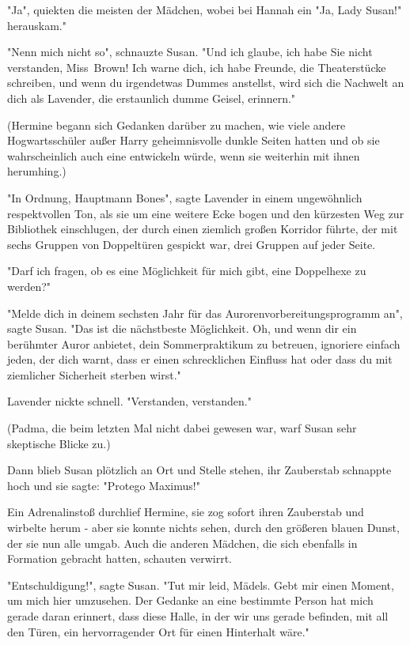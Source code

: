 {"Ja", quiekten die meisten der Mädchen, wobei bei Hannah ein "Ja, Lady Susan!" herauskam."

"Nenn mich nicht so", schnauzte Susan. "Und ich glaube, ich habe Sie nicht verstanden, Miss~Brown! Ich warne dich, ich habe Freunde, die Theaterstücke schreiben, und wenn du irgendetwas Dummes anstellst, wird sich die Nachwelt an dich als Lavender, die erstaunlich dumme Geisel, erinnern."

(Hermine begann sich Gedanken darüber zu machen, wie viele andere Hogwartsschüler außer Harry geheimnisvolle dunkle Seiten hatten und ob sie wahrscheinlich auch eine entwickeln würde, wenn sie weiterhin mit ihnen herumhing.)

"In Ordnung, Hauptmann Bones", sagte Lavender in einem ungewöhnlich respektvollen Ton, als sie um eine weitere Ecke bogen und den kürzesten Weg zur Bibliothek einschlugen, der durch einen ziemlich großen Korridor führte, der mit sechs Gruppen von Doppeltüren gespickt war, drei Gruppen auf jeder Seite.

"Darf ich fragen, ob es eine Möglichkeit für mich gibt, eine Doppelhexe zu werden?"

"Melde dich in deinem sechsten Jahr für das Aurorenvorbereitungsprogramm an", sagte Susan. "Das ist die nächstbeste Möglichkeit. Oh, und wenn dir ein berühmter Auror anbietet, dein Sommerpraktikum zu betreuen, ignoriere einfach jeden, der dich warnt, dass er einen schrecklichen Einfluss hat oder dass du mit ziemlicher Sicherheit sterben wirst."

Lavender nickte schnell. "Verstanden, verstanden."

(Padma, die beim letzten Mal nicht dabei gewesen war, warf Susan sehr skeptische Blicke zu.)

Dann blieb Susan plötzlich an Ort und Stelle stehen, ihr Zauberstab schnappte hoch und sie sagte: "Protego Maximus!"

Ein Adrenalinstoß durchlief Hermine, sie zog sofort ihren Zauberstab und wirbelte herum - aber sie konnte nichts sehen, durch den größeren blauen Dunst, der sie nun alle umgab. Auch die anderen Mädchen, die sich ebenfalls in Formation gebracht hatten, schauten verwirrt.

"Entschuldigung!", sagte Susan. "Tut mir leid, Mädels. Gebt mir einen Moment, um mich hier umzusehen. Der Gedanke an eine bestimmte Person hat mich gerade daran erinnert, dass diese Halle, in der wir uns gerade befinden, mit all den Türen, ein hervorragender Ort für einen Hinterhalt wäre."

}
